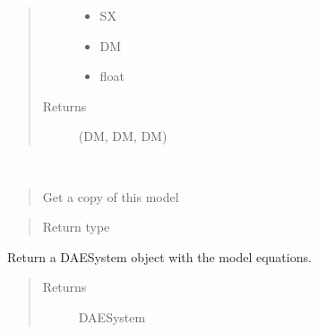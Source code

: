 \documentclass[letterpaper,10pt,english]{sphinxmanual}
\begin{document}
\begin{fulllineitems}
\begin{fulllineitems}
\begin{quote}
\begin{description}
\begin{itemize}
\item {} 
 \textendash{} SX

\item {} 
 \textendash{} DM

\item {} 
 \textendash{} float

\end{itemize}

\item[{Returns}] \leavevmode
(DM, DM, DM)

\end{description}\end{quote}

\end{fulllineitems}


\begin{fulllineitems}
\label{\detokenize{yaocptool.modelling:yaocptool.modelling.system_model.SystemModel.get_copy}}~\begin{quote}

Get a copy of this model
\end{quote}
\begin{quote}\begin{description}
\item[{Return type}] \leavevmode
{\hyperref[\detokenize{yaocptool.modelling:yaocptool.modelling.system_model.SystemModel}]{}}

\end{description}\end{quote}

\end{fulllineitems}


\begin{fulllineitems}
\label{\detokenize{yaocptool.modelling:yaocptool.modelling.system_model.SystemModel.get_dae_system}}
Return a DAESystem object with the model equations.
\begin{quote}\begin{description}
\item[{Returns}] \leavevmode
DAESystem


\end{description}
\end{quote}
\end{fulllineitems}
\end{fulllineitems}
\end{document}
